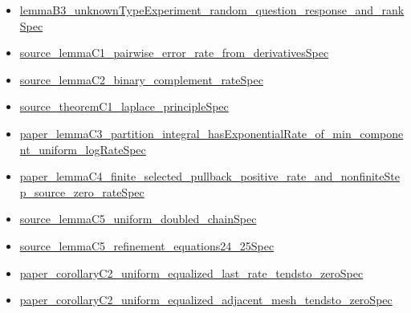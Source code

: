 \documentclass[10pt]{article}
\begin{document}
\begin{itemize}[leftmargin=1.2em]
\begin{itemize}[leftmargin=1.2em]
\item \hyperlink{source-claim-99b64aa08841b772}{lemma\allowbreak{}B3\_\allowbreak{}unknown\allowbreak{}Type\allowbreak{}Experiment\_\allowbreak{}random\_\allowbreak{}question\_\allowbreak{}response\_\allowbreak{}and\_\allowbreak{}rank\allowbreak{}Spec}
\item \hyperlink{source-claim-7ea3c8ab498f92dc}{source\_\allowbreak{}lemma\allowbreak{}C1\_\allowbreak{}pairwise\_\allowbreak{}error\_\allowbreak{}rate\_\allowbreak{}from\_\allowbreak{}derivatives\allowbreak{}Spec}
\item \hyperlink{source-claim-5122f84bd17b3a2c}{source\_\allowbreak{}lemma\allowbreak{}C2\_\allowbreak{}binary\_\allowbreak{}complement\_\allowbreak{}rate\allowbreak{}Spec}
\item \hyperlink{source-claim-d95b8ab740a8ceda}{source\_\allowbreak{}theorem\allowbreak{}C1\_\allowbreak{}laplace\_\allowbreak{}principle\allowbreak{}Spec}
\item \hyperlink{source-claim-7529d1dedcffdbe3}{paper\_\allowbreak{}lemma\allowbreak{}C3\_\allowbreak{}partition\_\allowbreak{}integral\_\allowbreak{}has\allowbreak{}Exponential\allowbreak{}Rate\_\allowbreak{}of\_\allowbreak{}min\_\allowbreak{}component\_\allowbreak{}uniform\_\allowbreak{}log\allowbreak{}Rate\allowbreak{}Spec}
\item \hyperlink{source-claim-043c064a62132f60}{paper\_\allowbreak{}lemma\allowbreak{}C4\_\allowbreak{}finite\_\allowbreak{}selected\_\allowbreak{}pullback\_\allowbreak{}positive\_\allowbreak{}rate\_\allowbreak{}and\_\allowbreak{}nonfinite\allowbreak{}Step\_\allowbreak{}source\_\allowbreak{}zero\_\allowbreak{}rate\allowbreak{}Spec}
\item \hyperlink{source-claim-f8aedb48228e5085}{source\_\allowbreak{}lemma\allowbreak{}C5\_\allowbreak{}uniform\_\allowbreak{}doubled\_\allowbreak{}chain\allowbreak{}Spec}
\item \hyperlink{source-claim-428f19cd38ba7b0a}{source\_\allowbreak{}lemma\allowbreak{}C5\_\allowbreak{}refinement\_\allowbreak{}equations24\_\allowbreak{}25\allowbreak{}Spec}
\item \hyperlink{source-claim-4cea7b91f971b40f}{paper\_\allowbreak{}corollary\allowbreak{}C2\_\allowbreak{}uniform\_\allowbreak{}equalized\_\allowbreak{}last\_\allowbreak{}rate\_\allowbreak{}tendsto\_\allowbreak{}zero\allowbreak{}Spec}
\item \hyperlink{source-claim-510e870d600e0e8e}{paper\_\allowbreak{}corollary\allowbreak{}C2\_\allowbreak{}uniform\_\allowbreak{}equalized\_\allowbreak{}adjacent\_\allowbreak{}mesh\_\allowbreak{}tendsto\_\allowbreak{}zero\allowbreak{}Spec}

\end{itemize}
\end{itemize}
\end{document}
